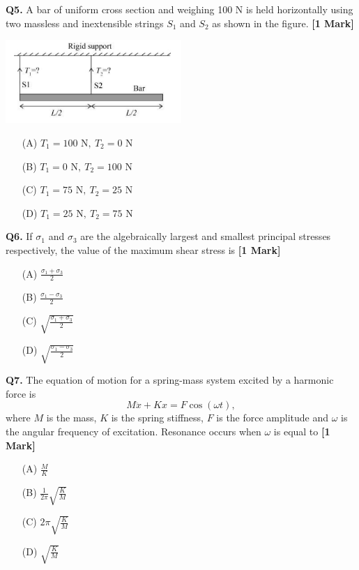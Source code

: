 \documentclass[11pt]{article}
\newcommand{\questiona}[2]{
    \noindent\textbf{Q#2.} #1 \hfill \textbf{[1 Mark]}
}
\begin{document}
\questiona{A bar of uniform cross section and weighing 100 N is held horizontally using two massless and inextensible strings \( S_1 \) and \( S_2 \) as shown in the figure.}{5}
\begin{center}
\includegraphics[width=0.5\textwidth]{figures/5.png}
\end{center}
\begin{enumerate}
    \item[(A)] \( T_1 = 100 \text{ N},\ T_2 = 0 \text{ N} \)
    \item[(B)] \( T_1 = 0 \text{ N},\ T_2 = 100 \text{ N} \)
    \item[(C)] \( T_1 = 75 \text{ N},\ T_2 = 25 \text{ N} \)
    \item[(D)] \( T_1 = 25 \text{ N},\ T_2 = 75 \text{ N} \)
\end{enumerate}
\vspace{0.5cm}

\questiona{If \( \sigma_1 \) and \( \sigma_3 \) are the algebraically largest and smallest principal stresses respectively, the value of the maximum shear stress is}{6}
\begin{enumerate}
    \item[(A)] \( \frac{\sigma_1 + \sigma_3}{2} \)
    \item[(B)] \( \frac{\sigma_1 - \sigma_3}{2} \)
    \item[(C)] \( \sqrt{\frac{\sigma_1 + \sigma_3}{2}} \)
    \item[(D)] \( \sqrt{\frac{\sigma_1 - \sigma_3}{2}} \)
\end{enumerate}
\vspace{0.5cm}

\questiona{The equation of motion for a spring-mass system excited by a harmonic force is
\[
M \ddot{x} + Kx = F \cos(\omega t),
\]
where \( M \) is the mass, \( K \) is the spring stiffness, \( F \) is the force amplitude and \( \omega \) is the angular frequency of excitation. Resonance occurs when \( \omega \) is equal to}{7}
\begin{enumerate}
    \item[(A)] \( \frac{M}{K} \)
    \item[(B)] \( \frac{1}{2\pi} \sqrt{\frac{K}{M}} \)
    \item[(C)] \( 2\pi \sqrt{\frac{K}{M}} \)
    \item[(D)] \( \sqrt{\frac{K}{M}} \)
\end{enumerate}
\vspace{0.5cm}
\end{document}
